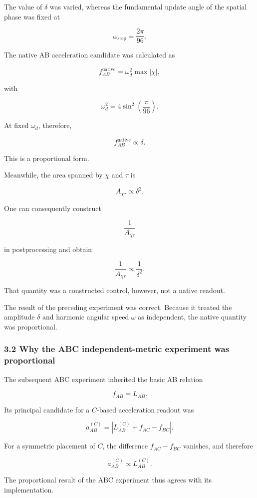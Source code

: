 \documentclass[
  a4paper,
]{article}
\begin{document}
The value of \(\delta\) was varied, whereas the fundamental update angle
of the spatial phase was fixed at

\[
\omega_{\mathrm{step}}
=\frac{2\pi}{96}.
\]

The native AB acceleration candidate was calculated as

\[
f_{AB}^{\mathrm{native}}
=\omega_d^2\max|\chi|,
\]

with

\[
\omega_d^2
=4\sin^2\left(\frac{\pi}{96}\right).
\]

At fixed \(\omega_d\), therefore,

\[
f_{AB}^{\mathrm{native}}\propto\delta.
\]

This is a proportional form.

Meanwhile, the area spanned by \(\chi\) and \(\tau\) is

\[
A_{\chi\tau}\propto\delta^2.
\]

One can consequently construct

\[
\frac{1}{A_{\chi\tau}}
\]

in postprocessing and obtain

\[
\frac{1}{A_{\chi\tau}}
\propto\frac{1}{\delta^2}.
\]

That quantity was a constructed control, however, not a native readout.

The result of the preceding experiment was correct. Because it treated
the amplitude \(\delta\) and harmonic angular speed \(\omega\) as
independent, the native quantity was proportional.

\subsubsection{3.2 Why the ABC independent-metric experiment was
proportional}\label{why-the-abc-independent-metric-experiment-was-proportional}

The subsequent ABC experiment inherited the basic AB relation

\[
f_{AB}=L_{AB}.
\]

Its principal candidate for a \(C\)-based acceleration readout was

\[
a_{AB}^{(C)}
=\left|L_{AB}^{(C)}+f_{AC}-f_{BC}\right|.
\]

For a symmetric placement of \(C\), the difference \(f_{AC}-f_{BC}\)
vanishes, and therefore

\[
a_{AB}^{(C)}\propto L_{AB}^{(C)}.
\]

The proportional result of the ABC experiment thus agrees with its
implementation.
\end{document}
